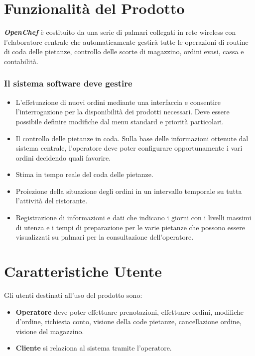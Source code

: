 \section{Funzionalit\`a del Prodotto}
{\bf \emph{OpenChef}} \`e costituito da una serie di palmari collegati in rete wireless 
con l'elaboratore centrale che automaticamente gestir\`a tutte le operazioni di routine 
di coda delle pietanze, controllo delle scorte di magazzino, ordini evasi, cassa 
e contabilit\`a.

\subsubsection{Il sistema software deve gestire}

\begin{itemize}
    \item L'effetuazione di nuovi ordini mediante una interfaccia e consentire l'interrogazione 
        per la disponibilit\`a dei prodotti necessari. Deve essere possibile definire modifiche 
        dal menu standard e priorit\`a particolari.
    \item Il controllo delle pietanze in coda. Sulla base delle informazioni ottenute dal 
        sistema centrale, l'operatore deve poter configurare opportunamente i vari ordini decidendo quali 
        favorire.
    \item Stima in tempo reale del coda delle pietanze.
    \item Proiezione della situazione degli ordini in un intervallo temporale su tutta l'attivit\`a 
        del ristorante.
    \item Registrazione di informazioni e dati che indicano i giorni con i livelli massimi di 
        utenza e i tempi di preparazione per le varie pietanze  che possono essere visualizzati 
        su palmari per la consultazione dell'operatore.
\end{itemize}

\section{Caratteristiche Utente}
Gli utenti destinati all'uso del prodotto sono:
\begin{itemize}
    \item {\bf Operatore} deve poter effettuare prenotazioni, effettuare ordini, modifiche d'ordine, 
        richiesta conto, visione della code pietanze, cancellazione ordine, visione del magazzino.
    \item {\bf Cliente} si relaziona al sistema tramite l'operatore.
\end{itemize}

